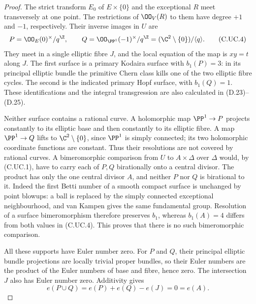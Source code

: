 \begin{proof}
The strict transform $E_0$ of $E\times\{0\}$
and the exceptional $R$ meet transversely at
one point. The restrictions of $\OO_V(R)$
to them have degree $+1$ and $-1$,
respectively. Their inverse images in $U$
are
\[
 P=\OO_E(0)^\times/q^{\Z},\qquad
 Q=\OO_{\PP^1}(-1)^\times/q^{\Z}
       =(\C^2\setminus\{0\})/\langle q\rangle.
\tag{C.UC.4}
\]
They meet in a single elliptic fibre $J$,
and the local equation of the map is
$xy=t$ along $J$. The first surface is a
primary Kodaira surface with $b_1(P)=3$:
in its principal elliptic bundle the primitive
Chern class kills one of the two elliptic
fibre cycles. The second is the indicated
primary Hopf surface, with $b_1(Q)=1$.
These identifications and the integral
transgression are also calculated in
(D.23)--(D.25).

Neither surface contains a rational curve.
A holomorphic map $\PP^1\to P$ projects
constantly to its elliptic base and then
constantly to its elliptic fibre. A map
$\PP^1\to Q$ lifts to $\C^2\setminus\{0\}$,
since $\PP^1$ is simply connected; its two
holomorphic coordinate functions are constant.
Thus their resolutions are not covered by
rational curves. A bimeromorphic comparison
from $U$ to $A\times\Delta$ over $\Delta$
would, by (C.UC.1), have to carry each of
$P,Q$ birationally onto a central divisor.
The product has only the one central
divisor $A$, and neither $P$ nor $Q$ is
birational to it. Indeed the first Betti
number of a smooth compact surface is
unchanged by point blowups: a ball is
replaced by the simply connected exceptional
neighbourhood, and van Kampen gives the
same fundamental group. Resolution of a
surface bimeromorphism therefore preserves
$b_1$, whereas $b_1(A)=4$ differs from
both values in (C.UC.4). This proves that
there is no such bimeromorphic comparison.

All these supports have Euler number zero.
For $P$ and $Q$, their principal elliptic
bundle projections are locally trivial
proper bundles, so their Euler numbers are
the product of the Euler numbers of base
and fibre, hence zero. The intersection
$J$ also has Euler number zero. Additivity
gives
\[
                    e(P\cup Q)=e(P)+e(Q)-e(J)=0=e(A).
\tag{C.UC.5}
\]


\end{proof}
